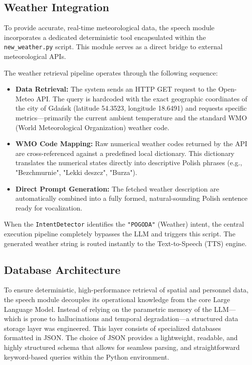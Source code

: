 \documentclass{article}
\begin{document}
	\subsection{Weather Integration}
    To provide accurate, real-time meteorological data, the speech module incorporates a dedicated deterministic tool encapsulated within the \texttt{new\_weather.py} script. This module serves as a direct bridge to external meteorological APIs.
    
    The weather retrieval pipeline operates through the following sequence:
    \begin{itemize}
        \item \textbf{Data Retrieval:} The system sends an HTTP GET request to the Open-Meteo API. The query is hardcoded with the exact geographic coordinates of the city of Gdańsk (latitude 54.3523, longitude 18.6491) and requests specific metrics—primarily the current ambient temperature and the standard WMO (World Meteorological Organization) weather code.
        \item \textbf{WMO Code Mapping:} Raw numerical weather codes returned by the API are cross-referenced against a predefined local dictionary. This dictionary translates the numerical states directly into descriptive Polish phrases (e.g., "Bezchmurnie", "Lekki deszcz", "Burza").
        \item \textbf{Direct Prompt Generation:} The fetched weather description are automatically combined into a fully formed, natural-sounding Polish sentence ready for vocalization. 
    \end{itemize}
    
    When the \texttt{IntentDetector} identifies the \texttt{"POGODA"} (Weather) intent, the central execution pipeline completely bypasses the LLM and triggers this script. The generated weather string is routed instantly to the Text-to-Speech (TTS) engine.

	\subsection{Database Architecture}
To ensure deterministic, high-performance retrieval of spatial and personnel data, the speech module decouples its operational knowledge from the core Large Language Model. Instead of relying on the parametric memory of the LLM—which is prone to hallucinations and temporal degradation—a structured data storage layer was engineered. This layer consists of specialized databases formatted in JSON. The choice of JSON provides a lightweight, readable, and highly structured schema that allows for seamless parsing, and straightforward keyword-based queries within the Python environment.
\end{document}
